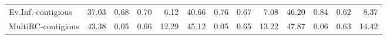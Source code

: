 \begin{tabular}{lrrrrrrrrrrrr}
Ev.Inf.-contigious &                   37.03 &                       0.68 &                             0.70 &                           6.12 &           40.66 &               0.76 &                     0.67 &                   7.08 &           46.20 &               0.84 &                     0.62 &                   8.37 \\
MultiRC-contigious &                   43.38 &                       0.05 &                             0.66 &                          12.29 &           45.12 &               0.05 &                     0.65 &                  13.22 &           47.87 &               0.06 &                     0.63 &                  14.42 \\
\bottomrule
\end{tabular}
